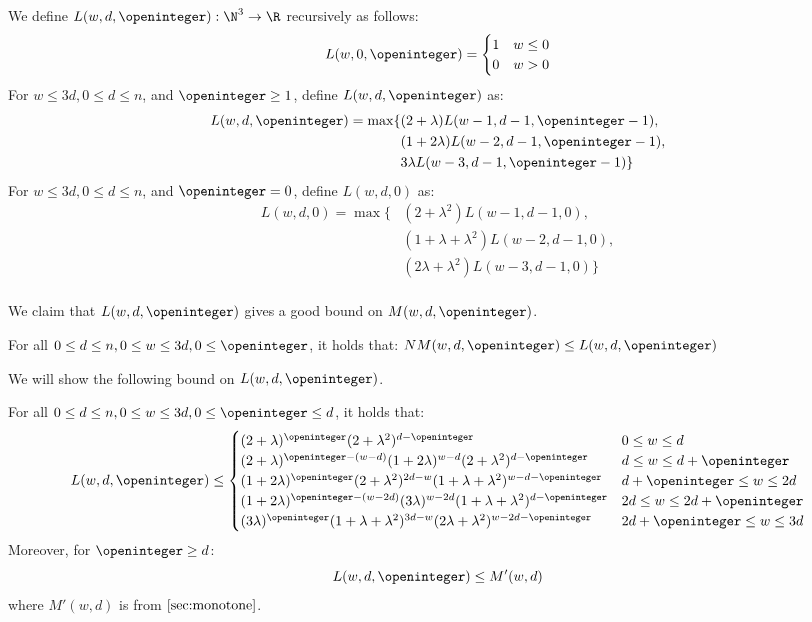 \begin{definition}[$L(w, d, \openinteger)$]
\label{def:Lwdo}
We define $L(w, d, \openinteger): \N^3\rightarrow \R$ recursively as follows:
\[
L(w, 0, \openinteger) = 
\begin{cases}
1 & w \le 0\\
0 & w > 0\\
\end{cases}
\]
For $w\le 3d, 0\le d\le n$, and $\openinteger \ge 1$, define $L(w, d, \openinteger)$ as:
\begin{align*}
L(w, d, \openinteger) = 
\max\{
& (2+\lambda) L(w-1, d-1, \openinteger-1),\\
& (1+2\lambda) L(w-2, d-1, \openinteger-1),\\
& 3\lambda L(w-3, d-1, \openinteger-1)
\}\\
\end{align*}
For $w\le 3d, 0\le d\le n$, and $\openinteger = 0$, define $L(w, d, 0)$ as:
\begin{align*}
L(w, d, 0) =
\max\{
& (2+\lambda^2) L(w-1, d-1, 0),\\
& (1+\lambda+\lambda^2) L(w-2, d-1, 0),\\
& (2\lambda + \lambda^2) L(w-3, d-1, 0)
\}\\
\end{align*}
\end{definition}

We claim that $L(w, d, \openinteger)$ gives a good bound on $M(w, d, \openinteger)$.

\begin{prop} 
\label{claim:NMwd-recurrence}
For all $0\le d\le n, 0\le w\le 3d, 0\le \openinteger$, it holds that:
$NM(w, d, \openinteger) \le L(w, d, \openinteger)$
\end{prop}

We will show the following bound on $L(w, d, \openinteger)$.

\begin{lemma} 
\label{lem:Lwdo}
For all $0\le d\le n, 0\le w\le 3d, 0\le \openinteger\le d$, it holds that:
\[
L(w,d,\openinteger) \le
\begin{cases}
(2+\lambda)^{\openinteger}(2+\lambda^2)^{d-\openinteger}
 & 0\le w \le d\\
(2+\lambda)^{\openinteger - (w-d)}(1+2\lambda)^{w-d}(2+\lambda^2)^{d-\openinteger}
 & d\le w \le d + \openinteger\\
(1+2\lambda)^{\openinteger}(2+\lambda^2)^{2d-w}(1+\lambda+\lambda^2)^{w-d-\openinteger}
& d+\openinteger\le w\le 2d\\
(1+2\lambda)^{\openinteger - (w-2d)}(3\lambda)^{w-2d}(1+\lambda+\lambda^2)^{d-\openinteger}
& 2d\le w\le 2d+\openinteger\\
(3\lambda)^{\openinteger}(1+\lambda+\lambda^2)^{3d-w}(2\lambda + \lambda^2)^{w-2d-\openinteger}
& 2d+\openinteger\le w\le 3d\\
\end{cases}
\]
Moreover, for $\openinteger \ge d$:
\[
   L(w, d, \openinteger) \le M'(w, d)
\]
where $M'(w, d)$ is from $\cref{sec:monotone}$.
\end{lemma}

